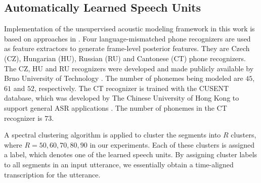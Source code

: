 \documentclass[a4paper]{article}
\begin{document}
\subsection{Automatically Learned Speech Units}
\label{purity results}
Implementation of the unsupervised acoustic modeling framework in this work is based on approaches in \cite{feng2016exploit}. Four language-mismatched phone recognizers are used as feature extractors to generate frame-level posterior features. They are Czech (CZ), Hungarian (HU), Russian (RU) and Cantonese (CT) phone recognizers. The CZ, HU and RU recognizers were developed and made publicly available by Brno University of Technology \cite{schwarz2009phoneme}. The number of phonemes being modeled are $45$, $61$ and $52$, respectively. The CT recognizer is trained with the CUSENT database, which was developed by The Chinese University of Hong Kong to support general ASR applications \cite{LeeLoChingEtAl2002}. The number of phonemes in the CT recognizer is $73$. 


A spectral clustering algorithm is applied to cluster the segments into $R$ clusters, where $R = 50, 60, 70, 80, 90$ in our experiments. Each of these clusters is assigned a label, which denotes one of the learned speech units.  By assigning cluster labels to all segments in an input utterance, we essentially obtain a time-aligned transcription for the utterance.
\end{document}
